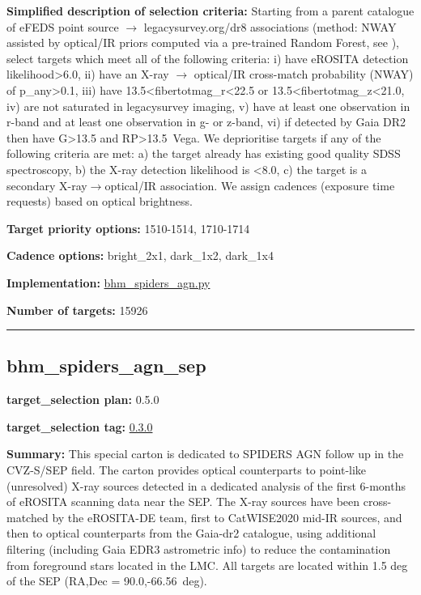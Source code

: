 \noindent\textbf{Simplified description of selection criteria:} Starting from a
parent catalogue of eFEDS point source $\rightarrow$ legacysurvey.org/dr8
associations (method: NWAY assisted by optical/IR priors computed via a
pre-trained Random Forest, see
\citealt{Salvato2022}), select targets which meet all of the following criteria:
i) have eROSITA detection likelihood\textgreater6.0, ii) have an X-ray $\rightarrow$
optical/IR cross-match probability (NWAY) of p\_any\textgreater0.1, iii)
have 13.5\textless fibertotmag\_r\textless22.5 or
13.5\textless fibertotmag\_z\textless21.0, iv) are not saturated in
legacysurvey imaging, v) have at least one observation in r-band and at
least one observation in g- or z-band, vi) if detected by Gaia DR2 then
have G\textgreater13.5 and RP\textgreater13.5~Vega. We deprioritise
targets if any of the following criteria are met: a) the target already
has existing good quality SDSS spectroscopy, b) the X-ray detection
likelihood is \textless8.0, c) the target is a secondary
X-ray$\rightarrow$optical/IR association. We assign cadences (exposure time
requests) based on optical brightness.


\noindent\textbf{Target priority options:} 1510-1514, 1710-1714

\noindent\textbf{Cadence options:} bright\_2x1, dark\_1x2, dark\_1x4

\noindent\textbf{Implementation:}
\href{https://github.com/sdss/target_selection/blob/0.3.0/python/target_selection/cartons/bhm_spiders_agn.py}{bhm\_spiders\_agn.py}

\noindent\textbf{Number of targets:} 15926

\begin{center}\rule{0.5\linewidth}{0.5pt}\end{center}

\hypertarget{bhm_spiders_agn_sep_plan0.5.0}{%
\subsection{bhm\_spiders\_agn\_sep}\label{bhm_spiders_agn_sep_plan0.5.0}}

\noindent\textbf{target\_selection plan:} 0.5.0

\noindent\textbf{target\_selection tag:}
\href{https://github.com/sdss/target_selection/tree/0.3.0/}{0.3.0}

\noindent\textbf{Summary:} This special carton is dedicated to SPIDERS AGN follow
up in the CVZ-S/SEP field. The carton provides optical counterparts to
point-like (unresolved) X-ray sources detected in a dedicated analysis
of the first 6-months of eROSITA scanning data near the SEP. The X-ray
sources have been cross-matched by the eROSITA-DE team, first to
CatWISE2020 \citep{Marocco2021}
mid-IR sources, and then to optical counterparts from the Gaia-dr2
catalogue, using additional filtering (including Gaia EDR3 astrometric
info) to reduce the contamination from foreground stars located in the
LMC. All targets are located within 1.5 deg of the SEP (RA,Dec =
90.0,-66.56~deg).


